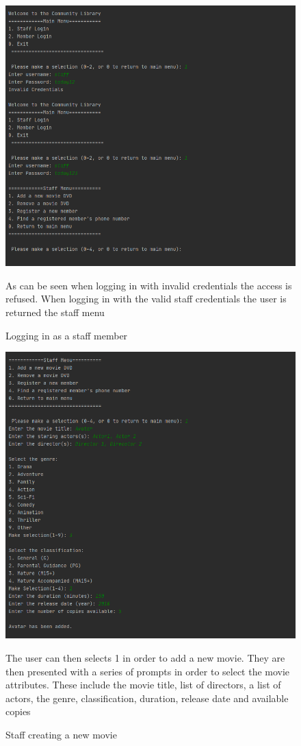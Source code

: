 \documentclass[a4paper,12pt]{article}
\begin{document}
\begin{figure}[!htb]
\centering
\includegraphics[width=1\textwidth]{1}
\caption{Logging in as a staff member}
\medskip
\small
As can be seen when logging in with invalid credentials the access is refused. When logging in with the valid staff credentials the user is returned the staff menu
\end{figure}

\begin{figure}[!htb]
\centering
\includegraphics[width=1\textwidth]{2}
\caption{Staff creating a new movie}
\medskip
\small
The user can then selects 1 in order to add a new movie. They are then presented with a series of prompts in order to select the movie attributes. These include the movie title, list of directors, a list of actors, the genre, classification, duration, release date and available copies 
\end{figure}
\end{document}
